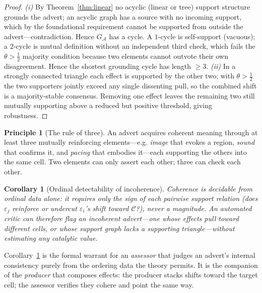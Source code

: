 \documentclass[twocolumn,11pt,a4paper]{article}
\theoremstyle{adv}
\newtheorem{corollary}[theorem]{Corollary}
\theoremstyle{definition}
\newtheorem{principle}[theorem]{Principle}
\theoremstyle{remark}
\newcommand{\Cell}{\mathcal{C}}        %
\newcommand{\Eff}{\varepsilon}        %
\newcommand{\Adv}{\mathcal{A}}        %
\newcommand{\half}{\tfrac{1}{2}}
\begin{document}
\begin{proof}
\emph{(i)} By Theorem~\ref{thm:linear} no acyclic (linear or tree) support
structure grounds the advert; an acyclic graph has a source with no
incoming support, which by the foundational requirement cannot be
supported from outside the advert---contradiction. Hence $G_\Adv$ has a
cycle. A $1$-cycle is self-support (vacuous); a $2$-cycle is mutual
definition without an independent third check, which fails the
$\theta>\half$ majority condition because two elements cannot
outvote their own disagreement. Hence the shortest grounding cycle has
length $\ge3$. \emph{(ii)} In a strongly connected triangle each effect is
supported by the other two; with $\theta>\half$ the two supporters
jointly exceed any single dissenting pull, so the combined shift is a
majority-stable consensus. Removing one effect leaves the remaining two
still mutually supporting above a reduced but positive threshold, giving
robustness.
\end{proof}

\begin{principle}[The rule of three]
\label{prin:three}
An advert acquires coherent meaning through at least three mutually
reinforcing elements---e.g. \emph{image} that evokes a region,
\emph{sound} that confirms it, and \emph{pacing} that embodies it---each
supporting the others into the same cell. Two elements can only assert each
other; three can check each other.
\end{principle}

\begin{corollary}[Ordinal detectability of incoherence]
\label{cor:detect}
Coherence is decidable from ordinal data alone: it requires only the
sign of each pairwise support relation (does $\Eff_j$ reinforce or
undercut $\Eff_i$'s shift toward $\Cell$?), never a magnitude. An automated
critic can therefore flag an incoherent advert---one whose effects pull
toward different cells, or whose support graph lacks a supporting
triangle---without estimating any catalytic value.
\end{corollary}

Corollary~\ref{cor:detect} is the formal warrant for an \emph{assessor}
that judges an advert's internal consistency purely from the ordering data
the theory permits. It is the companion of the \emph{producer} that
composes effects: the producer stacks shifts toward the target cell; the
assessor verifies they cohere and point the same way.

\end{document}
